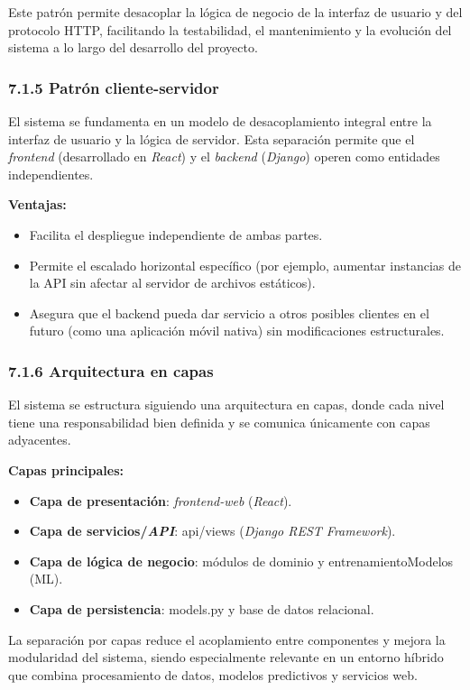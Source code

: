 Este patrón permite desacoplar la lógica de negocio de la interfaz de usuario y
del protocolo HTTP, facilitando la testabilidad, el mantenimiento y la evolución
del sistema a lo largo del desarrollo del proyecto.
 
\subsubsection{7.1.5 Patrón cliente-servidor}
 
El sistema se fundamenta en un modelo de desacoplamiento integral entre la
interfaz de usuario y la lógica de servidor. Esta separación permite que el
\textit{frontend} (desarrollado en \textit{React}) y el \textit{backend} (\textit{Django}) operen como entidades
independientes.
 
\textbf{Ventajas:}
\begin{itemize}
\item Facilita el despliegue independiente de ambas partes.
\item Permite el escalado horizontal específico (por ejemplo, aumentar instancias
de la API sin afectar al servidor de archivos estáticos).
\item Asegura que el backend pueda dar servicio a otros posibles clientes en el
futuro (como una aplicación móvil nativa) sin modificaciones estructurales.
\end{itemize}
 
\subsubsection{7.1.6 Arquitectura en capas}
 
El sistema se estructura siguiendo una arquitectura en capas, donde cada nivel
tiene una responsabilidad bien definida y se comunica únicamente con capas
adyacentes.
 
\textbf{Capas principales:}
\begin{itemize}
\item \textbf{Capa de presentación}: \textit{frontend-web} (\textit{React}).
\item \textbf{Capa de servicios/\textit{API}}: api/views (\textit{Django REST Framework}).
\item \textbf{Capa de lógica de negocio}: módulos de dominio y
entrenamientoModelos (ML).
\item \textbf{Capa de persistencia}: models.py y base de datos relacional.
\end{itemize}
 
La separación por capas reduce el acoplamiento entre componentes y mejora la
modularidad del sistema, siendo especialmente relevante en un entorno híbrido
que combina procesamiento de datos, modelos predictivos y servicios web.
 
